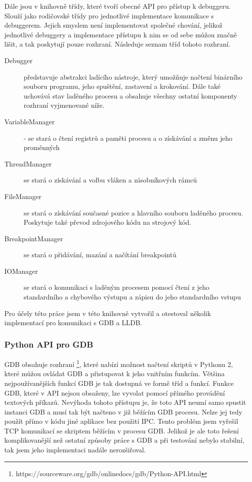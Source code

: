 \documentclass[bc,male,python,dept460]{diploma}						%
\newcommand{\parspace}[1][]{
	\ifthenelse{\isempty{#1}}{\vspace{5mm}}{\vspace{#1}}
	\par
}
\begin{document}
		\parspace Dále jsou v knihovně třídy, které tvoří obecné API pro přístup k debuggeru. Slouží jako rodičovské třídy pro jednotlivé implementace
		komunikace s debuggerem. Jejich smyslem není implementovat společné chování, jelikož jednotlivé debuggery a implementace přístupu k nim
		se od sebe můžou značně lišit, a tak poskytují pouze rozhraní. Následuje seznam tříd tohoto rozhraní.
		
		\begin{description}
			\item[Debugger] představuje abstrakci ladícího nástroje, který umožňuje načtení binárního souboru programu, jeho spuštění, zastavení
			a krokování. Dále také uchovává stav laděného procesu a obsahuje všechny ostatní komponenty rozhraní vyjmenované níže.
			\item[VariableManager] - se stará o čtení registrů a paměti procesu a o získávání a změnu jeho proměnných
			\item[ThreadManager] se stará o získávání a volbu vláken a zásobníkových rámců
			\item[FileManager] se stará o získávání současné pozice a hlavního souboru laděného procesu. Poskytuje také převod zdrojového kódu
			na strojový kód.
			\item[BreakpointManager] se stará o přidávání, mazání a načítání breakpointů
			\item[IOManager] se stará o komunikaci s laděným procesem pomocí čtení z jeho standardního a chybového výstupu a zápisu do jeho standardního vstupu
		\end{description}
		
		Pro účely této práce jsem v této knihovně vytvořil a otestoval několik implementací pro komunikaci s GDB a LLDB.

		\subsubsection{Python API pro GDB}
		GDB obsahuje rozhraní \footnote{https://sourceware.org/gdb/onlinedocs/gdb/Python-API.html}, které nabízí možnost načtení skriptů v Pythonu 2, které
		můžou ovládat GDB a přistupovat k jeho vnitřním funkcím. Většina nejpoužívanějších funkcí GDB je tak dostupná ve formě tříd a funkcí.
		Funkce GDB, které v API nejsou obsaženy, lze vyvolat pomocí přímého provádění textových příkazů.
		Nevýhoda tohoto přístupu je, že toto API neumí samo spustit instanci GDB a musí tak být načteno v již běžícím GDB procesu.
		Nelze jej tedy použít přímo v kódu jiné aplikace bez použití IPC. Tento problém jsem vyřešil TCP komunikací se skriptem běžícím
		v procesu GDB. Jelikož je ale toto řešení komplikovanější než ostatní způsoby práce s GDB a při testování
		nebylo stabilní, tak jsem jeho implementaci nadále nerozšiřoval.
		
\end{document}
